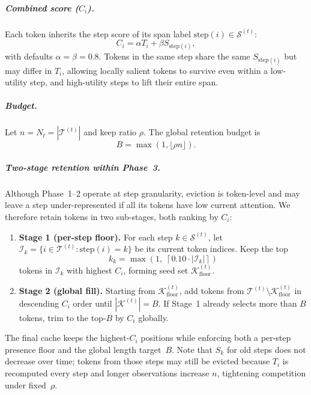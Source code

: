 \documentclass[11pt]{article}
\begin{document}
\subparagraph{Combined score ($C_i$).}
Each token inherits the step score of its span label $\mathrm{step}(i)\in\mathcal{S}^{(t)}$:
\begin{equation}
\label{eq:combined}
C_i = \alpha T_i + \beta S_{\mathrm{step}(i)},
\end{equation}
with defaults $\alpha=\beta=0.8$.
Tokens in the same step share the same $S_{\mathrm{step}(i)}$ but may differ in $T_i$, allowing locally salient tokens to survive even within a low-utility step, and high-utility steps to lift their entire span.

\subparagraph{Budget.}
Let $n=N_t=|\mathcal{T}^{(t)}|$ and keep ratio $\rho$.
The global retention budget is
\begin{equation}
\label{eq:budget}
B = \max\!\left(1, \lfloor \rho n \rfloor\right).
\end{equation}

\subparagraph{Two-stage retention within Phase~3.}
Although Phase~1--2 operate at step granularity, eviction is token-level and may leave a step under-represented if all its tokens have low current attention.
We therefore retain tokens in two sub-stages, both ranking by $C_i$:
\begin{enumerate}[leftmargin=*, nosep]
    \item \textbf{Stage 1 (per-step floor).}
    For each step $k\in\mathcal{S}^{(t)}$, let $\mathcal{I}_k=\{i\in\mathcal{T}^{(t)}:\mathrm{step}(i)=k\}$ be its current token indices.
    Keep the top
    \[
    k_k = \max\!\left(1,\;\left\lceil 0.10\cdot|\mathcal{I}_k|\right\rceil\right)
    \]
    tokens in $\mathcal{I}_k$ with highest $C_i$, forming seed set $\mathcal{K}^{(t)}_{\mathrm{floor}}$.
    \item \textbf{Stage 2 (global fill).}
    Starting from $\mathcal{K}^{(t)}_{\mathrm{floor}}$, add tokens from $\mathcal{T}^{(t)}\setminus\mathcal{K}^{(t)}_{\mathrm{floor}}$ in descending $C_i$ order until $|\mathcal{K}^{(t)}|=B$.
    If Stage~1 already selects more than $B$ tokens, trim to the top-$B$ by $C_i$ globally.
\end{enumerate}
The final cache keeps the highest-$C_i$ positions while enforcing both a per-step presence floor and the global length target~$B$.
Note that $S_k$ for old steps does not decrease over time; tokens from those steps may still be evicted because $T_i$ is recomputed every step and longer observations increase $n$, tightening competition under fixed~$\rho$.
\end{document}

